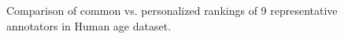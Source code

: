 \documentclass[10pt,journal,cspaper,compsoc]{IEEEtran}
\begin{document}
{\begin{figure}
 \begin{center}
  \caption{Comparison of common vs. personalized rankings of 9 representative annotators in Human age dataset.} \label{age_position_color}
\end{center}
\end{figure}


}
\end{document}
